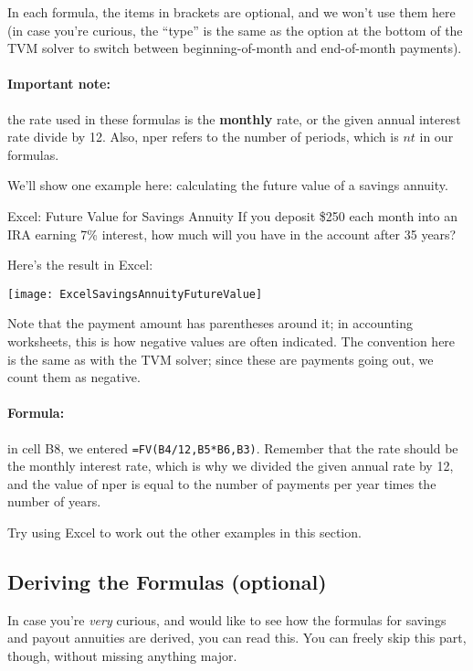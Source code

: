 In each formula, the items in brackets are optional, and we won't use them here (in case you're curious, the ``type'' is the same as the option at the bottom of the TVM solver to switch between beginning-of-month and end-of-month payments).\\

\paragraph{Important note:} the rate used in these formulas is the \textbf{monthly} rate, or the given annual interest rate divide by 12.  Also, nper refers to the number of periods, which is $nt$ in our formulas.

We'll show one example here: calculating the future value of a savings annuity.

\begin{example}{Excel: Future Value for Savings Annuity}
If you deposit \$250 each month into an IRA earning 7\% interest, how much will you have in the account after 35 years?

\sol
Here's the result in Excel:
\begin{center}
\texttt{[image: ExcelSavingsAnnuityFutureValue]}
\end{center}

Note that the payment amount has parentheses around it; in accounting worksheets, this is how negative values are often indicated.  The convention here is the same as with the TVM solver; since these are payments going out, we count them as negative.\\

\paragraph{Formula:} in cell B8, we entered \texttt{=FV(B4/12,B5*B6,B3)}.  Remember that the rate should be the monthly interest rate, which is why we divided the given annual rate by 12, and the value of nper is equal to the number of payments per year times the number of years.
\end{example}

\begin{try}
Try using Excel to work out the other examples in this section.
\end{try}
\vfill
\pagebreak

\subsection{Deriving the Formulas (optional)}
In case you're \emph{very} curious, and would like to see how the formulas for savings and payout annuities are derived, you can read this.  You can freely skip this part, though, without missing anything major.

